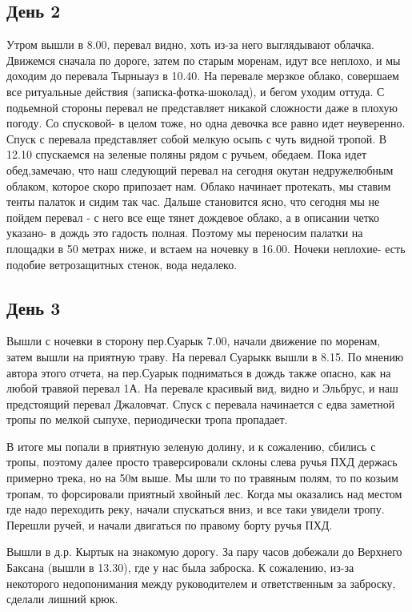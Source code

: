 \documentclass[]{article}
\newcommand{\tyr}{Тырныауз }
\begin{document}
\subsection{День 2}
Утром вышли в 8.00, перевал видно, хоть из-за него выглядывают облачка. Движемся сначала по дороге, затем по старым моренам, идут все неплохо, и мы доходим до перевала \tyr в 10.40. На перевале мерзкое облако, совершаем все ритуальные действия (записка-фотка-шоколад), и бегом уходим оттуда. С подьемной стороны перевал не представляет никакой сложности даже в плохую погоду. Со спусковой- в целом тоже, но одна девочка все равно идет  неуверенно.
Спуск с перевала представляет собой мелкую осыпь с чуть видной тропой. В 12.10 спускаемся на зеленые поляны рядом с ручьем, обедаем. Пока идет обед,замечаю, что наш следующий перевал на сегодня окутан недружелюбным облаком, которое скоро припозает нам. Облако начинает протекать, мы ставим тенты палаток и сидим так час. Дальше становится ясно, что сегодня мы не пойдем перевал - с него все еще тянет дождевое облако, а в описании четко указано- в дождь это гадость полная. Поэтому мы переносим палатки на площадки в 50 метрах ниже, и встаем на ночевку в 16.00. Ночеки неплохие- есть подобие ветрозащитных стенок, вода недалеко.

\subsection{День 3}
Вышли с ночевки в сторону пер.Суарык  7.00, начали движение по моренам, затем вышли на приятную траву. На перевал Суарыкк вышли в 8.15. По мнению автора этого отчета, на пер.Суарык подниматься в дождь также опасно, как на любой травяой перевал 1А.
На перевале красивый вид, видно и Эльбрус, и наш предстоящий перевал Джаловчат.
Спуск с перевала начинается с едва заметной тропы по мелкой сыпухе, периодически тропа пропадает. 

В итоге мы попали в приятную зеленую долину, и к сожалению, сбились с тропы, поэтому далее просто траверсировали склоны  слева ручья ПХД держась примерно трека, но на 50м выше.
Мы шли то по травяным полям, то по козьим тропам, то форсировали приятный хвойный лес. Когда мы оказались над местом где надо переходить реку, начали спускаться вниз, и все таки увидели тропу.
Перешли ручей, и начали двигаться по правому борту ручья ПХД. 

Вышли в д.р. Кыртык на знакомую дорогу. За пару часов добежали до Верхнего Баксана (вышли в 13.30), где у нас  была заброска. К сожалению, из-за некоторого недопонимания между руководителем и ответственным за заброску, сделали лишний крюк.
\end{document}
